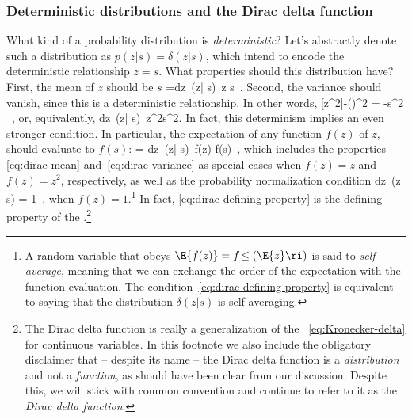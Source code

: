 \subsubsection{Deterministic distributions and the Dirac delta function}
What kind of a probability distribution is \emph{deterministic}?
Let's abstractly denote such a distribution as $p(z|s) = \delta(z|s)$, which intend to encode the deterministic relationship $z=s$.
What properties should this distribution have?
First, the mean of $z$ should be $s$
\be\label{eq:dirac-mean}
 =\int dz\ \delta(z| s)\, z \equiv s\, .
\ee
Second, the variance should vanish, since this is a deterministic relationship. In other words,
\be\label{eq:dirac-variance-zero}
[z^2]-\le(\ri)^2 =  -s^2 \, ,
\ee
or, equivalently,
\be\label{eq:dirac-variance}
\int dz\ \delta(z| s)\, z^2\equiv s^2.
\ee
In fact, this determinism implies an even stronger condition. %
In particular, 
the expectation of any function $f(z)$ of $z$, should evaluate to $f(s)$:
\be\label{eq:dirac-defining-property}
 = \int dz\ \delta(z| s)\, f(z) \equiv f(s)\, ,
\ee
which includes the properties \eqref{eq:dirac-mean} and~\eqref{eq:dirac-variance} as special cases when $f(z) = z$ and $f(z) = z^2$, respectively, as well as the probability normalization condition
\be \label{eq:dirac-delta-normalization}
\int dz\ \delta(z| s) = 1\, ,
\ee
when $f(z) = 1$.\footnote{A random variable that obeys $\E{f(z)} = f\!\le(\E{z}\ri)$ is said to \emph{self-average},  meaning that we can exchange the order of the expectation with the function evaluation. The condition~\eqref{eq:dirac-defining-property} is equivalent to saying that the distribution $\delta(z|s)$ is self-averaging.\label{footnote:self-average}} 
In fact, \eqref{eq:dirac-defining-property} is the defining property of the .\footnote{The Dirac delta function is really a generalization of the ~\eqref{eq:Kronecker-delta} for continuous variables.
In this footnote we also include the obligatory disclaimer that -- despite its name -- the Dirac delta function is a \emph{distribution} and not a \emph{function}, as should have been clear from our discussion. Despite this, we will stick with common convention and continue to refer to it as the \emph{Dirac delta function}.} 
 
